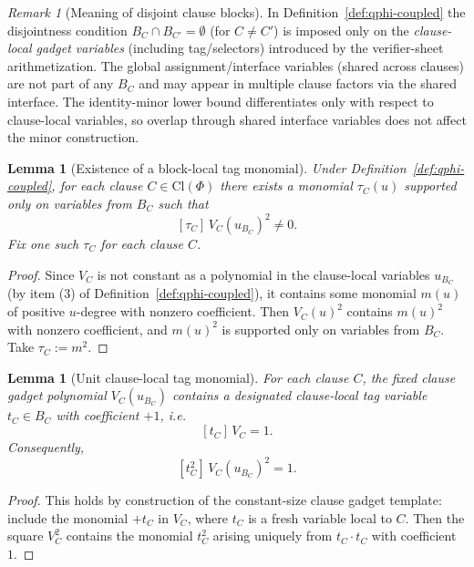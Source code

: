 \documentclass[12pt]{article}
\newtheorem{lemma}[theorem]{Lemma}
\theoremstyle{definition}
\theoremstyle{definition}
\theoremstyle{remark}
\newtheorem{remark}{Remark}
\theoremstyle{remark}
\begin{document}
\begin{remark}[Meaning of disjoint clause blocks]
In Definition~\ref{def:qphi-coupled} the disjointness condition
$B_C \cap B_{C'}=\emptyset$ (for $C\neq C'$) is imposed only on the
\emph{clause-local gadget variables} (including tag/selectors) introduced
by the verifier-sheet arithmetization. The global assignment/interface
variables (shared across clauses) are not part of any $B_C$ and may
appear in multiple clause factors via the shared interface.
The identity-minor lower bound differentiates only with respect to
clause-local variables, so overlap through shared interface variables
does not affect the minor construction.
\end{remark}

\begin{lemma}[Existence of a block-local tag monomial]
\label{lem:tag-monomial-exists}
Under Definition~\ref{def:qphi-coupled}, for each clause $C\in\mathrm{Cl}(\Phi)$ there
exists a monomial $\tau_C(u)$ supported only on variables from $B_C$ such that
\[
[\tau_C]\,V_C(u_{B_C})^2 \neq 0.
\]
Fix one such $\tau_C$ for each clause $C$.
\end{lemma}

\begin{proof}
Since $V_C$ is not constant as a polynomial in the clause-local variables $u_{B_C}$
(by item (3) of Definition~\ref{def:qphi-coupled}),
it contains some monomial $m(u)$ of positive $u$-degree with nonzero coefficient.
Then $V_C(u)^2$ contains $m(u)^2$ with nonzero coefficient, and $m(u)^2$ is supported
only on variables from $B_C$. Take $\tau_C := m^2$.
\end{proof}

\begin{lemma}[Unit clause-local tag monomial]
\label{lem:unit-clause-tag}\label{lem:unit-pivot-tag}
For each clause $C$, the fixed clause gadget polynomial $V_C(u_{B_C})$ contains a
designated clause-local tag variable $t_C\in B_C$ with coefficient $+1$, i.e.
\[
[t_C]\,V_C = 1.
\]
Consequently,
\[
[t_C^2]\,V_C(u_{B_C})^2 = 1.
\]
\end{lemma}

\begin{proof}
This holds by construction of the constant-size clause gadget template: include the
monomial $+t_C$ in $V_C$, where $t_C$ is a fresh variable local to $C$.
Then the square $V_C^2$ contains the monomial $t_C^2$ arising uniquely from
$t_C\cdot t_C$ with coefficient $1$.
\end{proof}
\end{document}
